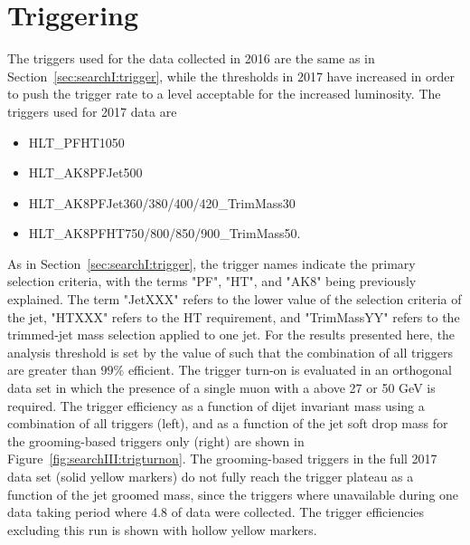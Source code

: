 \clearpage
\section{Triggering}
\label{sec:searchIII:trigger}
The triggers used for the data collected in 2016 are the same as in Section~\ref{sec:searchI:trigger}, while the thresholds in 2017 have increased in order to push the trigger rate to a level acceptable for the increased luminosity. The triggers used for 2017 data are
\begin{itemize}
  \itemsep0em
\item {HLT\_PFHT1050}
\item {HLT\_AK8PFJet500}
\item {HLT\_AK8PFJet360/380/400/420\_TrimMass30}
\item {HLT\_AK8PFHT750/800/850/900\_TrimMass50}.
\end{itemize}
As in Section~\ref{sec:searchI:trigger}, the trigger names indicate the primary selection criteria, with the terms "PF", "HT", and "AK8" being previously explained. The term "JetXXX" refers to the lower value of the \PT selection criteria of the jet, "HTXXX" refers to the HT requirement, and "TrimMassYY" refers to the trimmed-jet mass selection applied to one jet. For the results presented here, the analysis threshold is set by the value of \MVV such that the combination of all triggers are greater than $99 \%$ efficient. The trigger turn-on is evaluated in an orthogonal data set in which the presence of a single muon with a \PT above 27 or 50 GeV is required. The trigger efficiency as a function of dijet invariant mass using a combination of all triggers (left), and as a function of the jet soft drop mass for the grooming-based triggers only (right) are shown in Figure~\ref{fig:searchIII:trigturnon}. The grooming-based triggers in the full 2017 data set (solid yellow markers) do not fully reach the trigger plateau as a function of the jet groomed mass, since the triggers where unavailable during one data taking period where 4.8 \fbinv of data were collected. The trigger efficiencies excluding this run is shown with hollow yellow markers.
